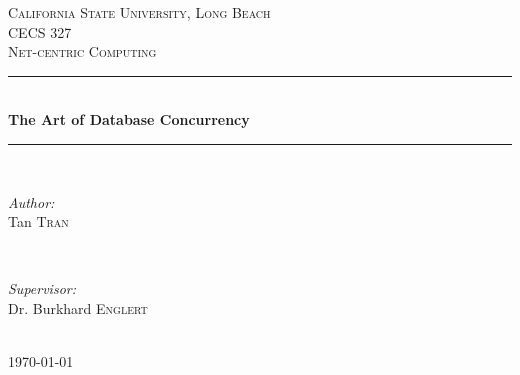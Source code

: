 \documentclass[12pt]{article} %
\begin{document}

\begin{titlepage}

\newcommand{\HRule}{\rule{\linewidth}{0.5mm}} %

\center %

\textsc{\LARGE California State University, Long Beach}\\[1.5cm] %
\textsc{\Large CECS 327}\\[0.5cm] %
\textsc{\large Net-centric Computing}\\[0.5cm] %

\HRule \\[0.4cm]
{ \huge \bfseries The Art of Database Concurrency}\\[0.4cm] %
\HRule \\[1.5cm]

\begin{minipage}{0.4\textwidth}
\begin{flushleft} \large
\emph{Author:}\\
Tan \textsc{Tran} %
\end{flushleft}
\end{minipage}
~
\begin{minipage}{0.4\textwidth}
\begin{flushright} \large
\emph{Supervisor:} \\
Dr. Burkhard \textsc{Englert} %
\end{flushright}
\end{minipage}\\[4cm]

{\large \today}\\[3cm] %


\vfill %

\end{titlepage}
\end{document}

